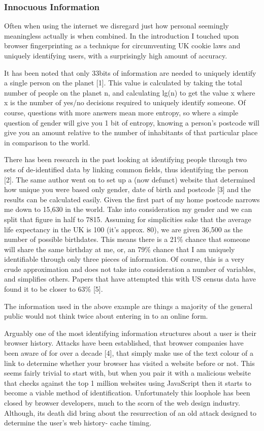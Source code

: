 \subsubsection{Innocuous Information}
Often when using the internet we disregard just how personal seemingly meaningless actually is when combined. In the introduction I touched upon browser fingerprinting as a technique for circumventing UK cookie laws and uniquely identifying users, with a surprisingly high amount of accuracy. 

It has been noted that only 33bits of information are needed to uniquely identify a single person on the planet [1]. This value is calculated by taking the total number of people on the planet n, and calculating lg(n) to get the value x where x is the number of yes/no decisions required to uniquely identify someone. Of course, questions with more answers mean more entropy, so where a simple question of gender will give you 1 bit of entropy, knowing a person’s postcode will  give you an amount relative to the number of inhabitants of that particular place in comparison to the world.

There has been research in the past looking at identifying people through two sets of de-identified data by linking common fields, thus identifying the person [2]. The same author went on to set up a (now defunct) website that determined how unique you were based only gender, date of birth and postcode [3] and the results can be calculated easily. Given the first part of my home postcode narrows me down to 15,630 in the world. Take into consideration my gender and we can split that figure in half to 7815. Assuming for simplicities sake that the average life expectancy in the UK is 100 (it’s approx. 80), we are given 36,500 as the number of possible birthdates. This means there is a 21\% chance that someone will share the same birthday at me, or, an 79\% chance that I am uniquely identifiable through only three pieces of information. Of course, this is a very crude approximation and does not take into consideration a number of variables, and simplifies others. Papers that have attempted this with US census data have found it to be closer to 63\% [5].

The information used in the above example are things a majority of the general public would not think twice about entering in to an online form.

Arguably one of the most identifying information structures about a user is their browser history. Attacks have been established, that browser companies have been aware of for over a decade [4], that simply make use of the text colour of a link to determine whether your browser has visited a website before or not. This seems fairly trivial to start with, but when you pair it with a malicious website that checks against the top 1 million websites using JavaScript then it starts to become a viable method of identification. Unfortunately this loophole has been closed by browser developers, much to the scorn of the web design industry. Although, its death did bring about the resurrection of an old attack designed to determine the user's web history- cache timing. 
